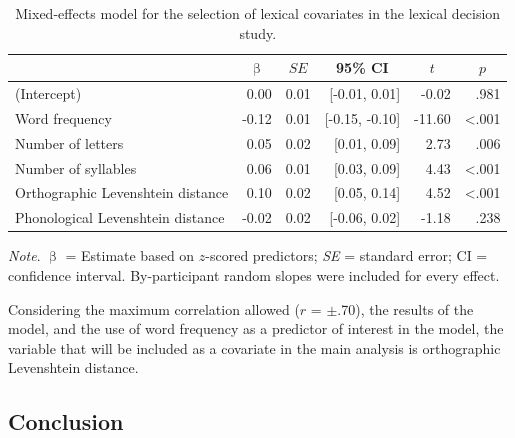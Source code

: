 \documentclass[
  12pt,
  man,floatsintext]{apa7}
\begin{document}
\begin{table}[!h]

\caption{\label{tab:lexicaldecision-lexical-covariates-selection}Mixed-effects model for the selection of lexical covariates in the lexical decision study.}
\centering
\begin{threeparttable}
\begin{tabular}[t]{lrrrrr}
\toprule
\multicolumn{1}{c}{ } & \multicolumn{1}{c}{$\upbeta$} & \multicolumn{1}{c}{$SE$} & \multicolumn{1}{c}{95\% CI} & \multicolumn{1}{c}{$t$} & \multicolumn{1}{c}{$p$}\\
\midrule
(Intercept) & 0.00 & 0.01 & {}[-0.01, 0.01] & -0.02 & .981\\
Word frequency & -0.12 & 0.01 & {}[-0.15, -0.10] & -11.60 & <.001\\
Number of letters & 0.05 & 0.02 & {}[0.01, 0.09] & 2.73 & .006\\
Number of syllables & 0.06 & 0.01 & {}[0.03, 0.09] & 4.43 & <.001\\
Orthographic Levenshtein distance & 0.10 & 0.02 & {}[0.05, 0.14] & 4.52 & <.001\\
Phonological Levenshtein distance & -0.02 & 0.02 & {}[-0.06, 0.02] & -1.18 & .238\\
\bottomrule
\end{tabular}
\begin{tablenotes}
\item \textit{\linebreak} 
\item \textit{Note}. $\upbeta$ = Estimate based on $z$-scored predictors; \textit{SE} = standard error; \linebreak \phantom{.}CI = confidence interval. By-participant random slopes were included for \linebreak \phantom{.}every effect.
\end{tablenotes}
\end{threeparttable}
\end{table}

Considering the maximum correlation allowed (\(r\) = \(\pm\).70), the results of the model, and the use of word frequency as a predictor of interest in the model, the variable that will be included as a covariate in the main analysis is orthographic Levenshtein distance.

\hypertarget{conclusion}{%
\subsection{Conclusion}\label{conclusion}}
\end{document}
